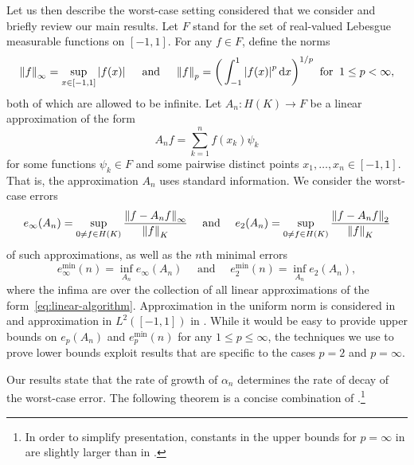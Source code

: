 \documentclass{mcom-l}
\numberwithin{equation}{section}
\numberwithin{theorem}{section} %
\begin{document}
Let us then describe the worst-case setting considered that we consider and briefly review our main results.
Let $F$ stand for the set of real-valued Lebesgue measurable functions on $[-1, 1]$.
For any $f \in F$, define the norms
\begin{equation*}
  \norm[0]{f}_\infty = \sup_{x \in [-1, 1]} \abs[0]{f(x)} \quad \text{ and } \quad \norm[0]{f}_p = \bigg( \int_{-1}^1 \abs[0]{f(x)}^p \dif x \bigg)^{1/p} \: \text{ for } \: 1 \leq p < \infty,
\end{equation*}
both of which are allowed to be infinite.
Let $A_n \colon H(K) \to F$ be a linear approximation of the form
\begin{equation} \label{eq:linear-algorithm}
  A_n f = \sum_{k=1}^n f(x_{k}) \psi_k
\end{equation}
for some functions $\psi_k \in F$ and some pairwise distinct points $x_1, \ldots, x_n \in [-1, 1]$.
That is, the approximation $A_n$ uses standard information.
We consider the worst-case errors
\begin{equation*}
  e_\infty(A_n) = \sup_{ 0 \neq f \in H(K)} \frac{\norm[0]{f - A_nf}_\infty}{\norm[0]{f}_K} \quad \text{ and } \quad e_2(A_n) = \sup_{ 0 \neq f \in H(K)} \frac{\norm[0]{f - A_nf}_{2}}{\norm[0]{f}_K}
\end{equation*}
of such approximations, as well as the $n$th minimal errors
\begin{equation*}
  e^{\min}_\infty(n) = \inf_{A_n} e_\infty(A_n) \quad \text{ and } \quad e^{\min}_2(n) = \inf_{A_n} e_2(A_n),
\end{equation*}
where the infima are over the collection of all linear approximations of the form~\eqref{eq:linear-algorithm}.
Approximation in the uniform norm is considered in  and approximation in $L^2([-1,1])$ in .
While it would be easy to provide upper bounds on $e_p(A_n)$ and $e_p^{\min}(n)$ for any $1 \leq p \leq \infty$, the techniques we use to prove lower bounds exploit results that are specific to the cases $p = 2$ and $p = \infty$.

Our results state that the rate of growth of $\alpha_n$ determines the rate of decay of the worst-case error.
The following theorem is a concise combination of .\footnote{In order to simplify presentation, constants in the upper bounds for $p = \infty$ in  are slightly larger than in .}
\end{document}
